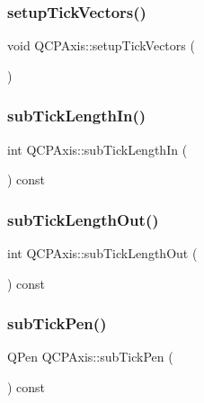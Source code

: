 \subsubsection{\texorpdfstring{setupTickVectors()}{setupTickVectors()}}
{\footnotesize\ttfamily void Q\+C\+P\+Axis\+::setup\+Tick\+Vectors (\begin{DoxyParamCaption}{ }\end{DoxyParamCaption})\hspace{0.3cm}{\ttfamily [protected]}}

\mbox{\label{class_q_c_p_axis_af907c8ecc4624d1bf4a8f6f702e64fbe}} 
\subsubsection{\texorpdfstring{subTickLengthIn()}{subTickLengthIn()}}
{\footnotesize\ttfamily int Q\+C\+P\+Axis\+::sub\+Tick\+Length\+In (\begin{DoxyParamCaption}{ }\end{DoxyParamCaption}) const}

\mbox{\label{class_q_c_p_axis_ac98c66cae50c98f3ae90e2969382976d}} 
\subsubsection{\texorpdfstring{subTickLengthOut()}{subTickLengthOut()}}
{\footnotesize\ttfamily int Q\+C\+P\+Axis\+::sub\+Tick\+Length\+Out (\begin{DoxyParamCaption}{ }\end{DoxyParamCaption}) const}

\mbox{\label{class_q_c_p_axis_a7a89df74ba427fac311bf4cc92fbddca}} 
\subsubsection{\texorpdfstring{subTickPen()}{subTickPen()}}
{\footnotesize\ttfamily Q\+Pen Q\+C\+P\+Axis\+::sub\+Tick\+Pen (\begin{DoxyParamCaption}{ }\end{DoxyParamCaption}) const\hspace{0.3cm}{\ttfamily [inline]}}

